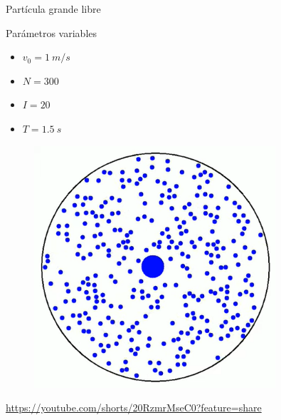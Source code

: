 \begin{frame}{Partícula grande libre}
    \begin{minipage}{0.45\textwidth}
        \begin{block}{Parámetros variables}
            \begin{itemize}
                \item $v_0 = 1\ m/s$
                \item $N = 300$
                \item $I = 20$
                \item $T = 1.5\ s$
            \end{itemize}
        \end{block}
    \end{minipage}
    \hfill
    \begin{minipage}{0.45\textwidth}
        \begin{figure}[H]
            \centering
            \includegraphics[width=0.8\textwidth]{pic/05-results/dcm_animation}
            \label{fig:dcm-animation}
        \end{figure}
        \tiny{\href{https://youtube.com/shorts/20RzmrMseC0?feature=share}{https://youtube.com/shorts/20RzmrMseC0?feature=share}}
    \end{minipage}
\end{frame}


